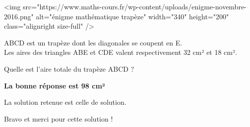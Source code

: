 
%
<img src="https://www.maths-cours.fr/wp-content/uploads/enigme-novembre-2016.png" alt="énigme mathématique trapèze" width="340" height="200" class="alignright size-full" />
\par
[Connaissances requises : à partir de la troisième]
\par

ABCD est un trapèze dont les diagonales se coupent en E.
\\
Les aires des triangles ABE et CDE valent respectivement 32 cm² et 18 cm².
\par
Quelle est l'aire totale du trapèze ABCD ?
\begin{solution}

     \textbf{La bonne réponse est 98 cm²}
\par
     La solution retenue est celle de solution.
     \par
     Bravo et merci pour cette solution !
     \par
{}%
     \par
     [pdf-embedder url="/wp-content/uploads/slides/enigme-12-16/1.pdf" width="676"]
\end{solution}
